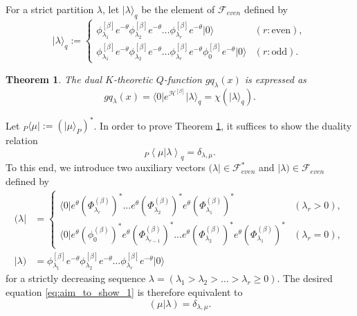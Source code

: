 \documentclass{amsart}
\newtheorem{thm}{Theorem}[section]
\def\ket#1{\vert #1 \rangle}
\def\bra#1{\langle #1 \vert}
\def\mket#1{\vert #1 )}
\def\mbra#1{( #1 \vert}
\def\inner#1#2{\left\langle #1|#2\right\rangle}
\begin{document}
For a strict partition $\lambda$, let $\ket{\lambda}_q$ be the element of $\mathcal{F}_{even}$ defined by 
\begin{equation}\label{eq:ket_q}
\ket{\lambda}_q:=
\begin{cases}
\phi^{[\beta]}_{\lambda_1}e^{-\theta}
\phi^{[\beta]}_{\lambda_2}e^{-\theta}
\dots
\phi^{[\beta]}_{\lambda_r}e^{-\theta} 
\ket{0} & (r:\mbox{even}),\\
\phi^{[\beta]}_{\lambda_1}e^{-\theta}
\phi^{[\beta]}_{\lambda_2}e^{-\theta}
\dots
\phi^{[\beta]}_{\lambda_r}e^{-\theta} 
\phi^{[\beta]}_{0}e^{-\theta} 
\ket{0} & (r:\mbox{odd}).
\end{cases}
\end{equation}
\begin{thm}\label{thm:gq}
The dual $K$-theoretic $Q$-function $gq_\lambda(x)$ is expressed as
\[
gq_\lambda(x)=\bra{0}e^{\mathcal{H}^{[\beta]}}\ket{\lambda}_q=
\chi(\ket{\lambda}_q).
\]
\end{thm}

Let ${}_P\bra{\mu}:=(\ket{\mu}_P)^\ast$.
In order to prove Theorem \ref{thm:gq}, it suffices to show the duality relation
\begin{equation}\label{eq:aim_to_show_1}
{}_P\inner{\mu}{\lambda}_q=\delta_{\lambda,\mu}.
\end{equation}
To this end, we introduce two auxiliary vectors $(\lambda|\in \mathcal{F}^\ast_{even}$ and $|\lambda)\in \mathcal{F}_{even}$ defined by
\[
\begin{aligned}
\mbra{\lambda}
&=
\begin{cases}
\bra{0}
e^\theta (\Phi^{(\beta)}_{\lambda_r})^\ast
\dots
e^\theta (\Phi^{(\beta)}_{\lambda_2})^\ast
e^\theta (\Phi^{(\beta)}_{\lambda_1})^\ast & (\lambda_r>0),\\
\bra{0}
e^\theta (\phi^{(\beta)}_{0})^\ast
e^\theta (\Phi^{(\beta)}_{\lambda_{r-1}})^\ast
\dots
e^\theta (\Phi^{(\beta)}_{\lambda_2})^\ast
e^\theta (\Phi^{(\beta)}_{\lambda_1})^\ast & (\lambda_r=0),
\end{cases}\\
\mket{\lambda}
&=
\phi^{[\beta]}_{\lambda_1}e^{-\theta}
\phi^{[\beta]}_{\lambda_2}e^{-\theta}
\dots
\phi^{[\beta]}_{\lambda_r}e^{-\theta}\ket{0}
\end{aligned}
\]
for a strictly decreasing sequence $\lambda=(\lambda_1>\lambda_2>\dots>\lambda_r\geq 0)$.
The desired equation \eqref{eq:aim_to_show_1} is therefore equivalent to
\begin{equation}\label{eq:to_prove_1}
(\mu|\lambda)=\delta_{\lambda,\mu}.
\end{equation}
\end{document}
